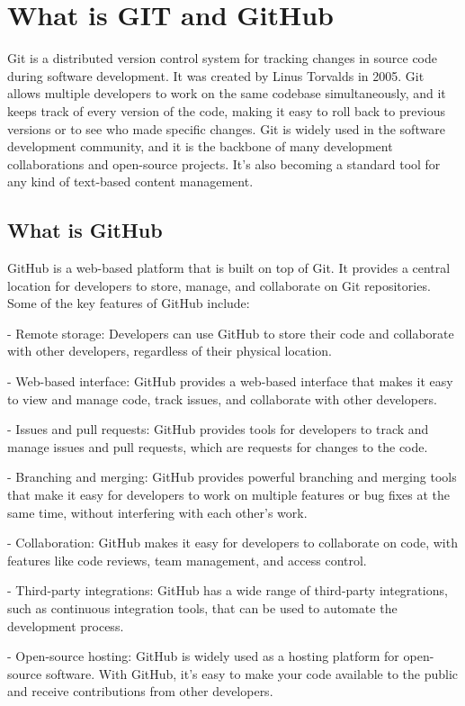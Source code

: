 \documentclass[conference]{IEEEtran}
\begin{document}
\section{What is GIT and GitHub}
Git is a distributed version control system for tracking changes in source code during software development. It was created by Linus Torvalds in 2005. Git allows multiple developers to work on the same codebase simultaneously, and it keeps track of every version of the code, making it easy to roll back to previous versions or to see who made specific changes. Git is widely used in the software development community, and it is the backbone of many development collaborations and open-source projects. It's also becoming a standard tool for any kind of text-based content management.

\subsection{What is GitHub}
GitHub is a web-based platform that is built on top of Git. It provides a central location for developers to store, manage, and collaborate on Git repositories. Some of the key features of GitHub include:

- Remote storage: Developers can use GitHub to store their code and collaborate with other developers, regardless of their physical location.

- Web-based interface: GitHub provides a web-based interface that makes it easy to view and manage code, track issues, and collaborate with other developers.

- Issues and pull requests: GitHub provides tools for developers to track and manage issues and pull requests, which are requests for changes to the code.

- Branching and merging: GitHub provides powerful branching and merging tools that make it easy for developers to work on multiple features or bug fixes at the same time, without interfering with each other's work.

- Collaboration: GitHub makes it easy for developers to collaborate on code, with features like code reviews, team management, and access control.

- Third-party integrations: GitHub has a wide range of third-party integrations, such as continuous integration tools, that can be used to automate the development process.

- Open-source hosting: GitHub is widely used as a hosting platform for open-source software. With GitHub, it's easy to make your code available to the public and receive contributions from other developers.
\end{document}
